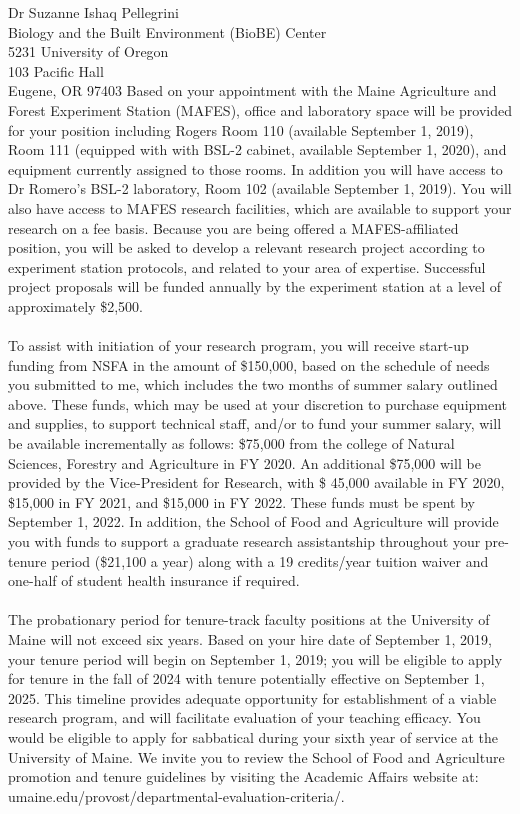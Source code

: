 \documentclass[a4paper,11pt]{letter}
\begin{document}
\begin{letter}{Dr Suzanne Ishaq Pellegrini\\Biology and the Built Environment (BioBE) Center\\5231 University of Oregon\\103 Pacific Hall\\Eugene, OR 97403}
Based on your appointment with the Maine Agriculture and Forest Experiment Station (MAFES), office and laboratory space will be provided for your position including Rogers Room 110 (available September 1, 2019), Room 111 (equipped with with BSL-2 cabinet, available September 1, 2020), and equipment currently assigned to those rooms. In addition you will have access to Dr Romero's BSL-2 laboratory, Room 102 (available September 1, 2019). You will also have access to MAFES research facilities, which are available to support your research on a fee basis. Because you are being offered a MAFES-affiliated position, you will be asked to develop a relevant research project according to experiment station protocols, and related to your area of expertise. Successful project proposals will be funded annually by the experiment station at a level of approximately \$2,500. 
\\~\\
To assist with initiation of your research program, you will receive start-up funding from NSFA in the amount of \$150,000, based on the schedule of needs you submitted to me, which includes the two months of summer salary outlined above. These funds, which may be used at your discretion to purchase equipment and supplies, to support technical staff, and/or to fund your summer salary, will be available incrementally as follows: \$75,000 from the college of Natural Sciences, Forestry and Agriculture in FY 2020. An additional \$75,000 will be provided by the Vice-President for Research, with \$ 45,000 available in FY 2020, \$15,000 in FY 2021, and \$15,000 in FY 2022. These funds must be spent by September 1, 2022. In addition, the School of Food and Agriculture will provide you with funds to support a graduate research assistantship throughout your pre-tenure period (\$21,100 a year) along with a 19 credits/year tuition waiver and one-half of student health insurance if required.
\\~\\
The probationary period for tenure-track faculty positions at the University of Maine will not exceed six years. Based on your hire date of September 1, 2019, your tenure period will begin on September 1, 2019; you will be eligible to apply for tenure in the fall of 2024 with tenure potentially effective on September 1, 2025. This timeline provides adequate opportunity for establishment of a viable research program, and will facilitate evaluation of your teaching efficacy.  You would be eligible to apply for sabbatical during your sixth year of service at the University of Maine.  We invite you to review the School of Food and Agriculture promotion and tenure guidelines by visiting the Academic Affairs website at: umaine.edu/provost/departmental-evaluation-criteria/.\\~\\

\end{letter}
\end{document}
